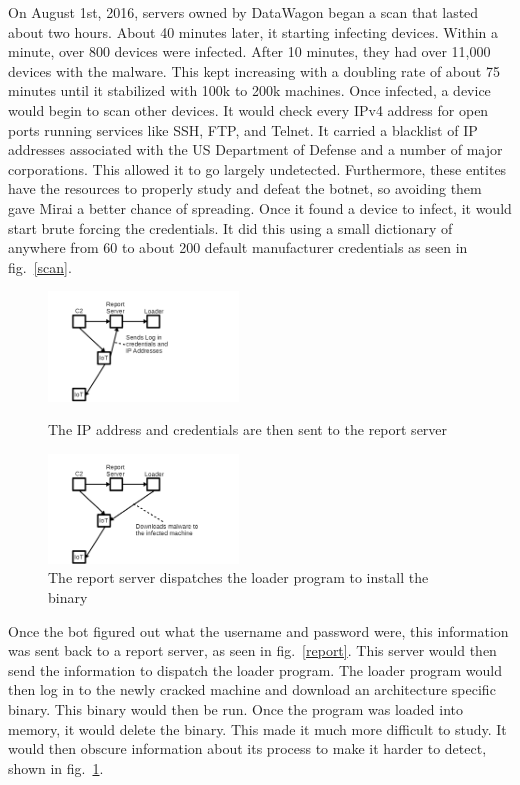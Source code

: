 \documentclass[conference]{IEEEtran}
\begin{document}
On August 1st, 2016, servers owned by DataWagon began a scan that lasted about two hours. About 40 minutes later, it starting infecting devices. Within a minute, over 800 devices were infected. After 10 minutes, they had over 11,000 devices with the malware. This kept increasing with a doubling rate of about 75 minutes until it stabilized with 100k to 200k machines. Once infected, a device would begin to scan other devices. It would check every IPv4 address for open ports running services like SSH, FTP, and Telnet. It carried a blacklist of IP addresses associated with the US Department of Defense and a number of major corporations. This allowed it to go largely undetected. Furthermore, these entites have the resources to properly study and defeat the botnet, so avoiding them gave Mirai a better chance of spreading. Once it found a device to infect, it would start brute forcing the credentials. It did this using a small dictionary of anywhere from 60 to about 200 default manufacturer credentials as seen in fig.~\ref{scan}. 

 \begin{figure}[t]
\centerline{\includegraphics[width=0.45\textwidth]{../fig2.png}}
\caption{The IP address and credentials are then sent to the report server}
\label{report}
\centerline{\includegraphics[width=0.45\textwidth]{../fig3.png}}
\caption{The report server dispatches the loader program to install the binary}
\label{loader}
\end{figure}

Once the bot figured out what the username and password were, this information was sent back to a report server, as seen in fig.~\ref{report}. This server would then send the information to dispatch the loader program. The loader program would then log in to the newly cracked machine and download an architecture specific binary. This binary would then be run. Once the program was loaded into memory, it would delete the binary. This made it much more difficult to study. It would then obscure information about its process to make it harder to detect, shown in fig.~\ref{loader}.
\end{document}
